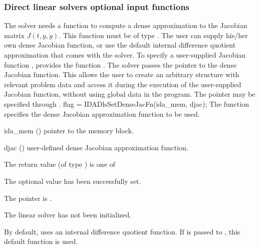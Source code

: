 {\subsubsection{Direct linear solvers optional input functions}\label{sss:optin_dls}
The 
{\idadense} solver needs a function to compute a dense approximation to
the Jacobian matrix $J(t,y,\dot{y})$.  
This function must be of type . 
The user can supply his/her own dense Jacobian function, or use the default 
internal difference quotient approximation
that comes with the {\idadense} solver.
To specify a user-supplied Jacobian function , {\idadense} provides 
the function .
The {\idadense} solver passes the pointer  
to the dense Jacobian function. This allows the user to
create an arbitrary structure with relevant problem data and access it
during the execution of the user-supplied Jacobian function, without
using global data in the program. 
The pointer  may be specified through .
{
  flag = IDADlsSetDenseJacFn(ida\_mem, djac);
}
{
  The function  specifies the dense Jacobian
  approximation function to be used.
}
{
  \begin{args}
  \item[ida\_mem] ()
    pointer to the {\ida} memory block.
  \item[djac] ()
    user-defined dense Jacobian approximation function.
  \end{args}
}
{
  The return value  (of type ) is one of
  \begin{args}
  \item[\Id{IDADLS\_SUCCESS}] 
    The optional value has been successfully set.
  \item[\Id{IDADLS\_MEM\_NULL}]
    The  pointer is .
  \item[\Id{IDADLS\_LMEM\_NULL}]
    The {\idadense} linear solver has not been initialized.
  \end{args}
}
{
  By default, {\idadense} uses an internal difference quotient function.
  If  is passed to , this default function is used.

}}
